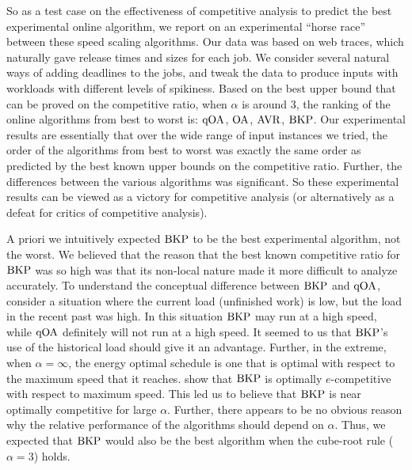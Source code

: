 \documentclass[11pt]{article}
\newcommand{\BKP}{{\rm BKP}}
\newcommand{\AVR}{{\rm AVR}}
\newcommand{\OA}{{\rm OA}}
\newcommand{\qOA}{{\rm qOA}}
\begin{document}
So as a test case on the effectiveness of competitive analysis to
predict the best experimental online algorithm,
we report on an experimental ``horse race'' between these speed scaling algorithms.
Our data was based on web traces, which naturally gave release times
and sizes for each job.
We consider several natural ways of adding deadlines
to the jobs, and tweak the data to produce inputs with workloads with 
different levels of spikiness. 
Based on the best upper bound that can be proved on the competitive ratio,
when $\alpha$ is around 3, the ranking of the online algorithms from best
to worst is: $\qOA$, $\OA$, $\AVR$, $\BKP$.
Our experimental results are essentially that over the wide range of input instances we
tried, the order of the algorithms from best to worst was
exactly the same order as predicted by the best known upper bounds on the competitive ratio.
Further, the differences between the various algorithms was
significant.
So these experimental results can be viewed as a victory for competitive analysis (or alternatively
as a defeat for critics of competitive analysis). 


A priori we intuitively expected $\BKP$ to be 
the best experimental algorithm, not the worst. 
We believed that the reason that the best known competitive ratio
for $\BKP$ was so high was that its non-local nature made it more difficult to analyze accurately.
To understand the conceptual difference between $\BKP$ and $\qOA$, consider
a situation where the current load (unfinished work) is low, but the load in the recent past was high.
In this situation $\BKP$ may run at a high speed, while $\qOA$ definitely will not run at a high speed.
It seemed to us that $\BKP$'s use of the historical load should give it an advantage.
Further, in the extreme, when $\alpha=\infty$,
the energy optimal schedule is one that is optimal with respect to the
maximum speed that it reaches. \cite{BKP} show that $\BKP$ is optimally $e$-competitive
with respect to maximum speed. 
This led us to believe that $\BKP$ is near optimally competitive for large $\alpha$.
Further, there appears to be no obvious reason why the relative performance of the algorithms
should depend on $\alpha$. 
Thus, we expected that $\BKP$ would also be the best algorithm when
the cube-root rule ($\alpha=3$) holds.
\end{document}
